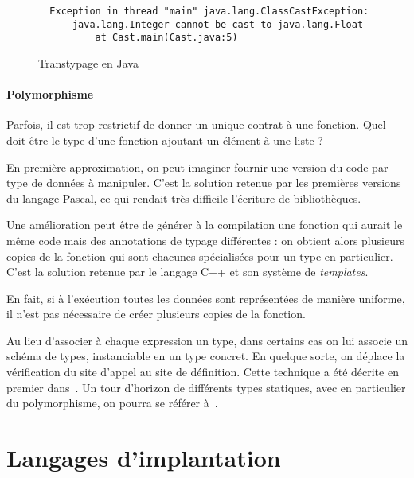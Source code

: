 \begin{figure}

  \begin{Verbatim}
  Exception in thread "main" java.lang.ClassCastException:
      java.lang.Integer cannot be cast to java.lang.Float
          at Cast.main(Cast.java:5)
  \end{Verbatim}

  \caption{Transtypage en Java}

  \label{fig:javacast}
\end{figure}

\paragraph{Polymorphisme}


Parfois, il est trop restrictif de donner un unique contrat à une fonction. Quel
doit être le type d'une fonction ajoutant un élément à une liste ?

En première approximation, on peut imaginer fournir une version du code par type
de données à manipuler. C'est la solution retenue par les premières versions du
langage Pascal, ce qui rendait très difficile l'écriture de
bibliothèques\cite{PascalNoEscape}.

Une amélioration peut être de générer à la compilation une fonction qui aurait
le même code mais des annotations de typage différentes : on obtient alors
plusieurs copies de la fonction qui sont chacunes spécialisées pour un type en
particulier. C'est la solution retenue par le langage C++ et son système de
\emph{templates}.

En fait, si à l'exécution toutes les données sont représentées de manière
uniforme, il n'est pas nécessaire de créer plusieurs copies de la fonction.

Au lieu d'associer à chaque expression un type, dans certains cas on lui associe
un schéma de types, instanciable en un type concret. En quelque sorte, on
déplace la vérification du site d'appel au site de définition. Cette technique a
été décrite en premier dans~\cite{Milner78}.
Un tour d'horizon de différents types statiques, avec en particulier du
polymorphisme, on pourra se référer à~\cite{TAPL}.

\section{Langages d'implantation}

